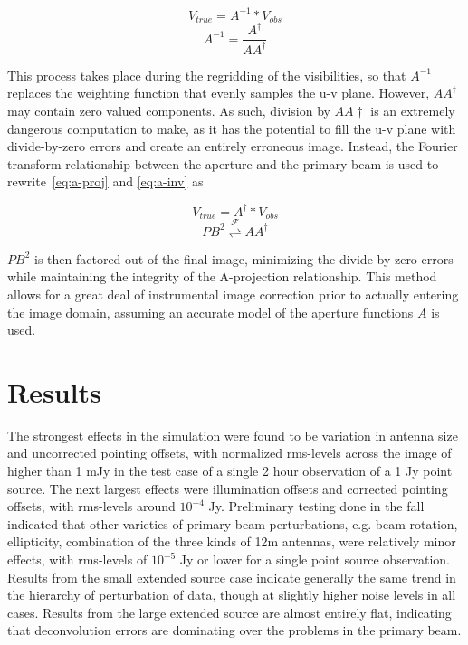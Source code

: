 \documentclass[11pt]{article}
\begin{document}
\begin{equation}
    \label{eq:a-proj}
    V_{true} = A^{-1} * V_{obs}
\end{equation}
\begin{equation}
    \label{eq:a-inv}
    A^{-1} = \frac{A^{\dagger}}{AA^{\dagger}}
\end{equation}

This process takes place during the regridding of the visibilities, so that 
$A^{-1}$ replaces the weighting function that evenly samples the u-v plane.  
However, $AA^{\dagger}$ may contain zero valued components. As such, division 
by $AA{\dagger}$ is an extremely dangerous computation to make, as it has the 
potential to fill the u-v plane with divide-by-zero errors and create an 
entirely erroneous image. Instead, the Fourier transform relationship between 
the aperture and the primary beam is used to rewrite~\eqref{eq:a-proj} and 
\eqref{eq:a-inv} as

\begin{equation}
    \label{eq:a-proj-cor}
    V_{true} = A^{\dagger} * V_{obs}
\end{equation}
\begin{equation}
    \label{eq:imcor}
    PB^2 \overset{\mathcal{F}}{\rightleftharpoons} AA^{\dagger}
\end{equation}

$PB^2$ is then factored out of the final image, minimizing the divide-by-zero 
errors while maintaining the integrity of the A-projection relationship. This 
method allows for a great deal of instrumental image correction prior to 
actually entering the image domain, assuming an accurate model of the aperture 
functions $A$ is used.

\section{Results}

The strongest effects in the simulation were found to be
variation in antenna size and uncorrected pointing offsets, with normalized 
rms-levels across the image of higher than 1 mJy in the test case of a single 2 
hour observation of a 1 Jy point source.  The next largest effects were 
illumination offsets and corrected pointing offsets, with rms-levels around 
$10^{-4}$ Jy.  Preliminary testing done in the fall indicated that other 
varieties of primary beam perturbations, e.g. beam rotation, ellipticity, 
combination of the three kinds of 12m antennas, were relatively minor effects, 
with rms-levels of $10^{-5}$ Jy or lower for a single point source observation.  
Results from the small extended source case indicate generally the same trend 
in the hierarchy of perturbation of data, though at slightly higher noise 
levels in all cases.  Results from the large extended source are almost 
entirely flat, indicating that deconvolution errors are dominating over the 
problems in the primary beam.
\end{document}
